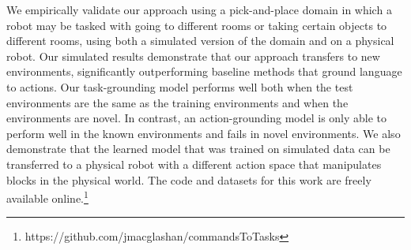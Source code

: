 \documentclass[conference]{IEEEtran}
\begin{document}

We empirically validate our approach using a
pick-and-place domain in which a robot may be tasked with going to
different rooms or taking certain objects to different rooms, using both a simulated version of the domain and
on a physical robot.  Our simulated results
demonstrate that our approach transfers to new environments,
significantly outperforming baseline methods that ground language to
actions.  
Our task-grounding
model performs well both when the test environments are the same as
the training environments and when the environments are novel. In
contrast, an action-grounding model is only able to perform well in
the known environments and fails in novel environments.  We also
demonstrate that the learned model that was trained on simulated
data can be transferred to a physical robot with a different action
space that manipulates blocks in the physical world. The code and
datasets for 
this work are freely available online.\footnote{https://github.com/jmacglashan/commandsToTasks}


\end{document}
